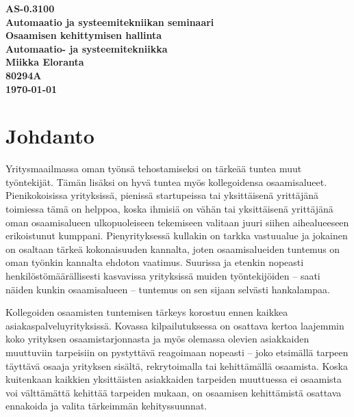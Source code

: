 \documentclass[a4paper,finnish,12pt]{article}
\begin{document}
\thispagestyle{empty}

\begin{titlepage}
    \centering
    \vspace*{10\baselineskip}
    \Large
    \bfseries
    AS-0.3100 \\ Automaatio ja systeemitekniikan seminaari \\
    \vspace{\baselineskip}
    \huge
    Osaamisen kehittymisen hallinta \\
    [1.5\baselineskip]
    \normalfont
    \vfill
    \small
    Automaatio- ja systeemitekniikka \\
    \vfill
    Miikka Eloranta \\
    80294A \\[2\baselineskip]
    \textbf{\today} \\[2\baselineskip]
    \vfill


\end{titlepage}


\clearpage

\tableofcontents

\clearpage

\section{Johdanto}

Yritysmaailmassa oman työnsä tehostamiseksi on tärkeää tuntea muut työntekijät. Tämän lisäksi on hyvä tuntea myös kollegoidensa osaamisalueet. Pienikokoisissa yrityksissä, pienissä startupeissa tai yksittäisenä yrittäjänä toimiessa tämä on helppoa, koska ihmisiä on vähän tai yksittäisenä yrittäjänä oman osaamisalueen ulkopuoleiseen tekemiseen valitaan juuri siihen aihealueeseen erikoistunut kumppani. Pienyrityksessä kullakin on tarkka vastuualue ja jokainen on osaltaan tärkeä kokonaisuuden kannalta, joten osaamisalueiden tuntemus on oman työnkin kannalta ehdoton vaatimus. Suurissa ja etenkin nopeasti henkilöstömäärällisesti kasvavissa yrityksissä muiden työntekijöiden -- saati näiden kunkin osaamisalueen -- tuntemus on sen sijaan selvästi hankalampaa.

Kollegoiden osaamisten tuntemisen tärkeys korostuu ennen kaikkea asiakaspalveluyrityksissä. Kovassa kilpailutuksessa on osattava kertoa laajemmin koko yrityksen osaamistarjonnasta ja myös olemassa olevien asiakkaiden muuttuviin tarpeisiin on pystyttävä reagoimaan nopeasti -- joko etsimällä tarpeen täyttävä osaaja yrityksen sisältä, rekrytoimalla tai kehittämällä osaamista. Koska kuitenkaan kaikkien yksittäisten asiakkaiden tarpeiden muuttuessa ei osaamista voi välttämättä kehittää tarpeiden mukaan, on osaamisen kehittämistä osattava ennakoida ja valita tärkeimmän kehityssuunnat.
\end{document}
